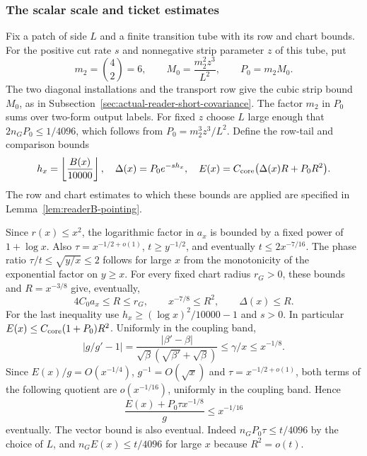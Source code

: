 \subsubsection{The scalar scale and ticket estimates}

Fix a patch of side $L$ and a finite transition tube with its row and
chart bounds. For the positive cut rate $s$ and nonnegative strip
parameter $z$ of this tube, put
\[
 m_2=\binom42=6,\qquad M_0=\frac{m_2^2 z^3}{L^2},
 \qquad P_0=m_2M_0.
\]
The two diagonal installations and the transport row give the cubic
strip bound $M_0$, as in Subsection~\ref{sec:actual-reader-short-covariance}.
The factor $m_2$ in $P_0$ sums over two-form output labels. For fixed
$z$ choose $L$ large enough that $2n_GP_0\le1/4096$, which follows from
$P_0=m_2^3 z^3/L^2$. Define the row-tail and comparison bounds
\[
 h_x=\left\lfloor\frac{B(x)}{10000}\right\rfloor,\quad
 \Delta(x)=P_0e^{-s h_x},\quad
 E(x)=C_{\rm core}\bigl(\Delta(x)R+P_0R^2\bigr).
\]
The row and chart estimates to which these bounds are applied are
specified in Lemma~\ref{lem:readerB-pointing}.

Since $r(x)\le x^2$, the logarithmic factor in $a_x$ is bounded by
a fixed power of $1+\log x$. Also $\tau=x^{-1/2+o(1)}$,
$t\ge y^{-1/2}$, and eventually $t\le2x^{-7/16}$. The phase ratio
$\tau/t\le\sqrt{y/x}\le2$ follows for large $x$ from the monotonicity
of the exponential factor on $y\ge x$. For every fixed chart radius
$r_G>0$, these bounds and $R=x^{-3/8}$ give, eventually,
\begin{equation}\label{eq:readerB-clearance}
 4C_0 a_x\le R\le r_G,\qquad x^{-7/8}\le R^2,\qquad
 \Delta(x)\le R.
\end{equation}
For the last inequality use $h_x\ge(\log x)^2/10000-1$ and $s>0$.
In particular $E(x)\le C_{\rm core}(1+P_0)R^2$. Uniformly in the
coupling band,
\[
 |g/g'-1|=\frac{|\beta'-\beta|}
                {\sqrt\beta(\sqrt{\beta'}+\sqrt\beta)}
       \le\gamma/x\le x^{-1/8}.
\]
Since $E(x)/g=O(x^{-1/4})$, $g^{-1}=O(\sqrt{x})$ and
$\tau=x^{-1/2+o(1)}$, both terms of the following quotient are
$o(x^{-1/16})$, uniformly in the coupling band. Hence
\begin{equation}\label{eq:readerB-ticket-bill}
 \frac{E(x)+P_0\tau x^{-1/8}}{g}\le x^{-1/16}
\end{equation}
eventually. The vector bound is also eventual. Indeed
$n_GP_0\tau\le t/4096$ by the choice of $L$, and
$n_GE(x)\le t/4096$ for large $x$ because $R^2=o(t)$.

